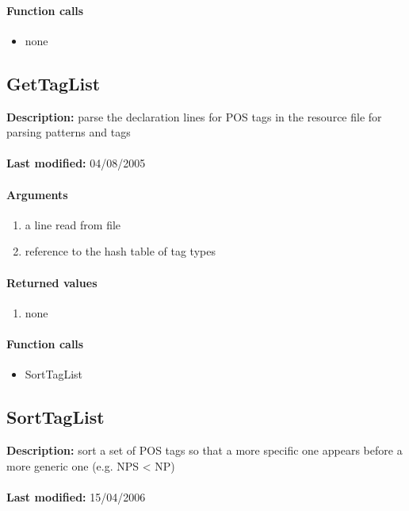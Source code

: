\paragraph{Function calls}
\begin{itemize}
\item none
\end{itemize}

\subsection{GetTagList}
\textbf{Description:} parse the declaration lines for POS tags in the resource file for parsing patterns and tags\\
\\\textbf{Last modified:} 04/08/2005

\paragraph{Arguments}
\begin{enumerate}
\item a line read from file
\item reference to the hash table of tag types
\end{enumerate}

\paragraph{Returned values}
\begin{enumerate}
\item none
\end{enumerate}

\paragraph{Function calls}
\begin{itemize}
\item SortTagList
\end{itemize}

\subsection{SortTagList}
\textbf{Description:} sort a set of POS tags so that a more specific one appears before a more generic one (e.g. NPS < NP)\\
\\\textbf{Last modified:} 15/04/2006

